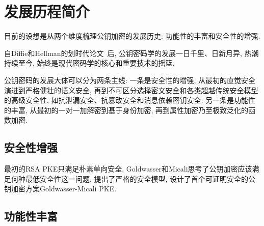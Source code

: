 \section{发展历程简介}
目前的设想是从两个维度梳理公钥加密的发展历史: 功能性的丰富和安全性的增强. 

自Diffie和Hellman的划时代论文~\cite{DH-IEEE-IT-1976}后, 
公钥密码学的发展一日千里、日新月异, 热潮持续至今, 始终是现代密码学的核心和重要技术的摇篮. 

公钥密码的发展大体可以分为两条主线: 一条是安全性的增强, 从最初的直觉安全演进到严格健壮的语义安全, 
再到不可区分选择密文安全和各类超越传统安全模型的高级安全性, 如抗泄漏安全、抗篡改安全和消息依赖密钥安全; 
另一条是功能性的丰富, 从最初的一对一加解密到基于身份加密, 再到属性加密乃至极致泛化的函数加密. 

\subsection{安全性增强}
最初的RSA PKE只满足朴素单向安全. 
Goldwasser和Micali思考了公钥加密应该满足何种最低安全性这一问题, 提出了严格的安全模型, 设计了首个可证明安全的公钥加密方案Goldwasser-Micali PKE. 



\subsection{功能性丰富}
